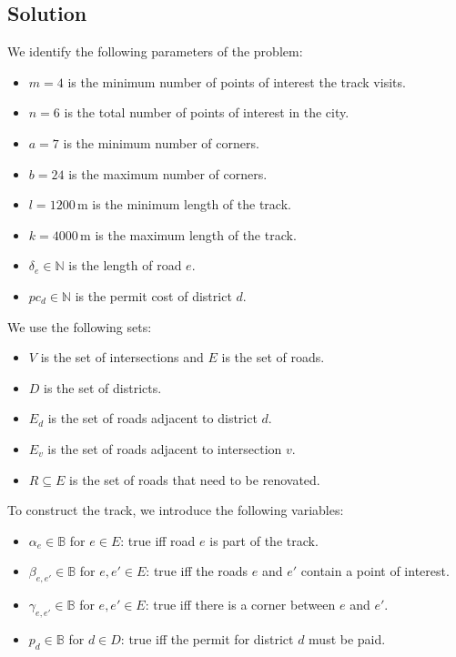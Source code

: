 \subsection{Solution}

\begingroup

\newcommand\ite[3]{\mathtt{ite}(#1,#2,#3)}
We identify the following parameters of the problem:
\begin{itemize}
  \item $m = 4$ is the minimum number of points of interest the track visits.
  \item $n = 6$ is the total number of points of interest in the city.
  \item $a = 7$ is the minimum number of corners.
  \item $b = 24$ is the maximum number of corners.
  \item $l = 1200$\,m is the minimum length of the track.
  \item $k = 4000$\,m is the maximum length of the track.
  \item $\delta_e \in \mathbb{N}$ is the length of road $e$.
  \item $pc_d \in \mathbb{N}$ is the permit cost of district $d$.
\end{itemize}

We use the following sets:
\begin{itemize}
  \item $V$ is the set of intersections and $E$ is the set of roads.
  \item $D$ is the set of districts.
  \item $E_d$ is the set of roads adjacent to district $d$.
  \item $E_v$ is the set of roads adjacent to intersection $v$.
  \item $R \subseteq E$ is the set of roads that need to be renovated.
\end{itemize}

To construct the track, we introduce the following variables:
\begin{itemize}
  \item $\alpha_e \in \mathbb{B}$ for $e \in E$: true iff road $e$ is part of the track.
  \item $\beta_{e,e'} \in \mathbb{B}$ for $e,e' \in E$: true iff the roads $e$ and $e'$ contain a point of interest.
  \item $\gamma_{e,e'} \in \mathbb{B}$ for $e,e' \in E$: true iff there is a corner between $e$ and $e'$.
  \item $p_d \in \mathbb{B}$ for $d \in D$: true iff the permit for district $d$ must be paid.
\end{itemize}



